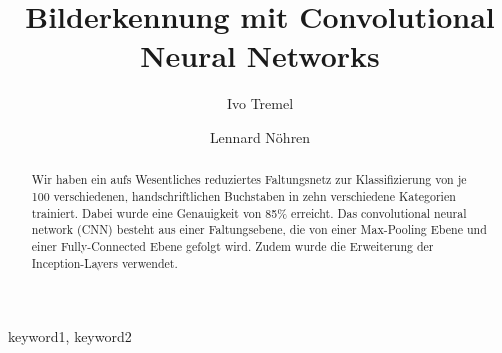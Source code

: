 \documentclass[runningheads,a4paper]{llncs}[2015/06/24]
\begin{document}
\title{Bilderkennung mit Convolutional Neural Networks}

\author{Ivo Tremel \and Lennard Nöhren}

%

			
\maketitle

\begin{abstract}
Wir haben ein aufs Wesentliches reduziertes Faltungsnetz zur Klassifizierung von je 100  verschiedenen, handschriftlichen Buchstaben
in zehn verschiedene Kategorien trainiert. Dabei wurde eine Genauigkeit von 85\% erreicht. Das convolutional neural network (CNN) besteht aus einer Faltungsebene, die von einer Max-Pooling Ebene und einer Fully-Connected Ebene gefolgt wird. Zudem wurde die Erweiterung der Inception-Layers verwendet.
\end{abstract}

\begin{keywords}
keyword1, keyword2
\end{keywords}

\end{document}
